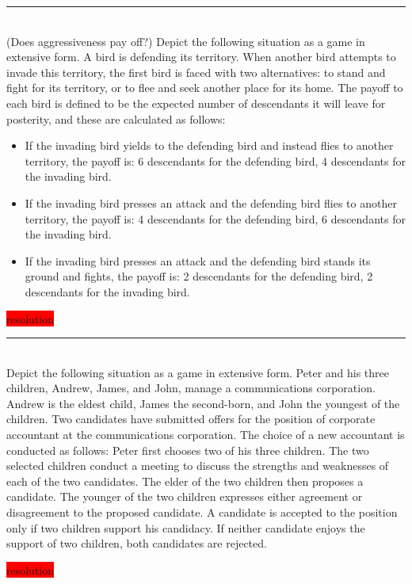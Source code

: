 \documentclass[10pt]{report}
\newenvironment{exercise}[1]
    {\vspace{0.5cm}\hrule\vspace{0.5cm}\noindent\fbox{#1}\\}
    {\vspace{0.5cm}}
\newenvironment{response}
{\vspace{0.2cm}\noindent\colorbox{red}{resolution}}
    {\vspace{0.5cm}}
\begin{document}
\begin{exercise}{3.3}
	(Does aggressiveness pay off?) Depict the following situation as a game in extensive form. A bird is defending its territory. When another bird attempts to invade this territory, the first bird is faced with two alternatives: to stand and fight for its territory, or to flee and seek another place for its home. The payoff to each bird is defined to be the expected number of descendants it will leave for posterity, and these are calculated as follows:
	\begin{itemize}
		\item  If the invading bird yields to the defending bird and instead flies to another territory, the payoff is: 6 descendants for the defending bird, 4 descendants for the invading bird.
		\item If the invading bird presses an attack and the defending bird flies to another territory, the payoff is: 4 descendants for the defending bird, 6 descendants for the invading bird.
		\item If the invading bird presses an attack and the defending bird stands its ground and fights, the payoff is: 2 descendants for the defending bird, 2 descendants for the invading bird.
	\end{itemize}

	\begin{response}
	\end{response}
\end{exercise}

\begin{exercise}{3.4}
	Depict the following situation as a game in extensive form. Peter and his three children, Andrew, James, and John, manage a communications corporation. Andrew is the eldest child, James the second-born, and John the youngest of the children. Two candidates have submitted offers for the position of corporate accountant at the communications corporation. The choice of a new accountant is conducted as follows: Peter first chooses two of his three children. The two selected children conduct a meeting to discuss the strengths and weaknesses of each of the two candidates. The elder of the two children then proposes a candidate. The younger of the two children expresses either agreement or disagreement to the proposed candidate. A candidate is accepted to the position only if two children support his candidacy. If neither candidate enjoys the support of two children, both candidates are rejected.

	\begin{response}
	\end{response}

\end{exercise}
\end{document}
